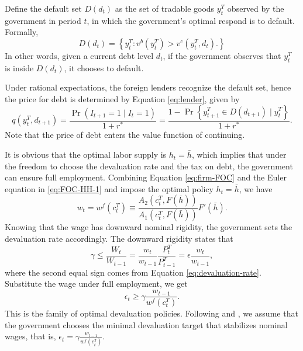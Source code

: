Define the default set $D(d_t)$ as the set of tradable goods $y^T_t$ observed by the government in period $t$, in which the government's optimal respond is to default. Formally,
\begin{equation}
    D(d_t) = \left\{ 
        y^T_t : v^b(y^T_t) > v^c(y^T_t, d_t).
     \right\}
\end{equation}
In other words, given a current debt level $d_t$, if the government observes that $y^T_t$ is inside $D(d_t)$, it chooses to default.

Under rational expectations, the foreign lenders recognize the default set, hence the price for debt is determined by Equation \eqref{eq:lender}, given by
\begin{equation}
    q(y^T_t, d_{t+1}) = \frac{\Pr(I_{t+1} = 1 \mid I_t = 1)}{1 + r^*} =
    \frac{1 - \Pr\left\{ y^T_{t+1} \in D(d_{t+1}) \mid y^T_t \right\}}{1 + r^*}.
\end{equation}
Note that the price of debt enters the value function of continuing.

It is obvious that the optimal labor supply is $h_t = \bar{h}$, which implies that under the freedom to choose the devaluation rate and the tax on debt, the government can ensure full employment. Combining Equation \eqref{eq:firm-FOC} and the Euler equation in \eqref{eq:FOC-HH-1} and impose the optimal policy $h_t = \bar{h}$, we have
\begin{equation}
    w_t = w^f(c^T_t) \equiv \frac{A_2(c^T_t, F(\bar{h}))}{A_1(c^T_t, F(\bar{h}))} F'(\bar{h}).
\end{equation}
Knowing that the wage has downward nominal rigidity, the government sets the devaluation rate accordingly. The downward rigidity states that
\begin{equation*}
    \gamma \le \frac{W_t}{W_{t-1}} = \frac{w_t}{w_{t-1}} \frac{P^T_t}{P^T_{t-1}} = \epsilon \frac{w_t}{w_{t-1}},
\end{equation*}
where the second equal sign comes from Equation \eqref{eq:devaluation-rate}. Substitute the wage under full employment, we get
\begin{equation}
    \epsilon_t \ge \gamma \frac{w_{t-1}}{w^f(c^T_t)}.
\end{equation}
This is the family of optimal devaluation policies. Following \citet*{Na-18} and \citet*{Hinrichsen_2020-chapter4}, we assume that the government chooses the minimal devaluation target that stabilizes nominal wages, that is, $
    \epsilon_t = \gamma \frac{w_{t-1}}{w^f(c^T_t)}.
$